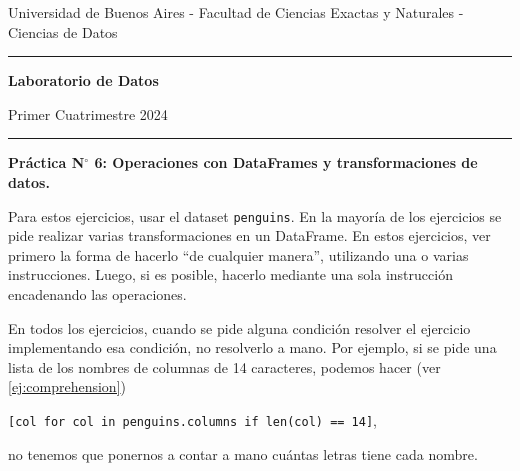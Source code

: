 \documentclass[a4paper,11pt]{article}
\theoremstyle{definition}
\begin{document}
\centerline{{\small Universidad de Buenos Aires - Facultad de Ciencias Exactas y Naturales - Ciencias de Datos}}

\vskip 0.2cm

\hrule

\vskip 0.2cm

 \centerline{{\bf\Large{\sc Laboratorio de Datos}}}

 \vskip 0.2cm

 \centerline{\ttfamily Primer Cuatrimestre 2024}

\vskip 0.2cm

 \hrule

 \bigskip
 \centerline{\bf Práctica N$^\circ$ 6: Operaciones con DataFrames y transformaciones de datos.}
 \bigskip



Para estos ejercicios, usar el dataset \lstinline{penguins}. En la mayoría de los ejercicios se pide realizar varias transformaciones en un DataFrame. En estos ejercicios, ver primero la forma de hacerlo ``de cualquier manera'', utilizando una o varias instrucciones. Luego, si es posible, hacerlo mediante una sola instrucción encadenando las operaciones.

En todos los ejercicios, cuando se pide alguna condición resolver el ejercicio implementando esa condición, no resolverlo a mano. Por ejemplo, si se pide una lista de los nombres de columnas de 14 caracteres, podemos hacer (ver \ref{ej:comprehension})

\lstinline{[col for col in penguins.columns if len(col) == 14]},

no tenemos que ponernos a contar a mano cu\'antas letras tiene cada nombre.
\end{document}
